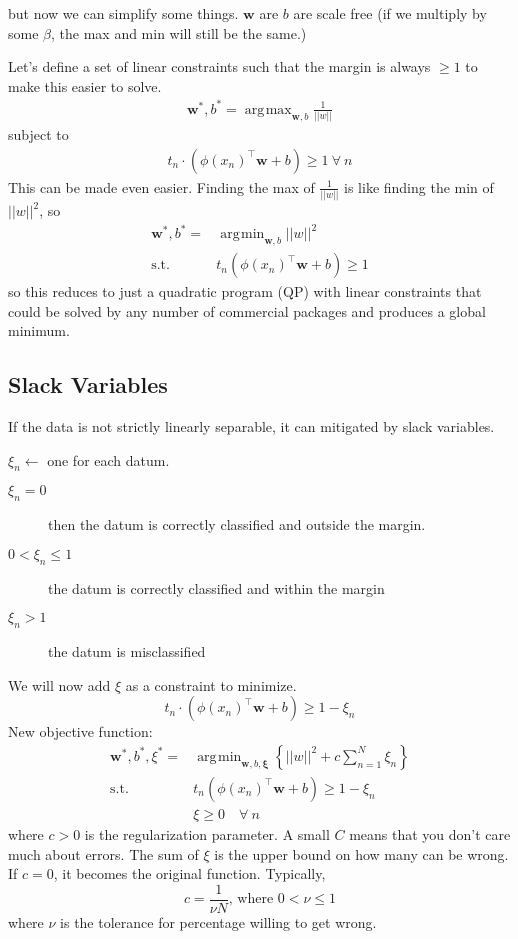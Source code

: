 \documentclass[11pt, oneside]{article}   	%
\DeclareMathOperator*{\argmin}{\arg\!\min}
\DeclareMathOperator*{\argmax}{\arg\!\max}
\begin{document}
but now we can simplify some things. $\mathbf{w}$ are $b$ are scale free (if we multiply by some $\beta$, the max and min will still be the same.)

Let's define a set of linear constraints such that the margin is always $\ge 1$ to make this easier to solve.
\begin{align}
\mathbf{w}^*,b^*= \argmax_{\mathbf{w},b}\frac{1}{||w||}
\end{align}
subject to 
\begin{align}
t_n\cdot(\phi(x_n)^\intercal\mathbf{w}+b) \ge 1 \:\forall\: n
\end{align}
This can be made even easier. Finding the max of $\frac{1}{||w||}$ is like finding the min of $||w||^2$, so
\begin{align}
\mathbf{w}^*,b^*=& \argmin_{\mathbf{w},b}||w||^2 \\
\text{s.t.} \:& t_n(\phi(x_n)^\intercal\mathbf{w} + b) \ge 1
\end{align}
so this reduces to just a quadratic program (QP) with linear constraints that could be solved by any number of commercial packages and produces a global minimum.

\subsection{Slack Variables}
If the data is not strictly linearly separable, it can mitigated by slack variables.

$\xi_n \leftarrow$ one for each datum. 
\begin{description}
 \item[$\xi_n = 0$] then the datum is correctly classified and outside the margin.
 \item[$0 < \xi_n \le 1$] the datum is correctly classified and within the margin
 \item[$\xi_n > 1$] the datum is misclassified
\end{description}

We will now add $\xi$ as a constraint to minimize.
\[
t_n\cdot(\phi(x_n)^\intercal\mathbf{w}+b) \ge 1 - \xi_n
\]
New objective function:
\begin{align}
\mathbf{w}^*,b^*,\xi^*=& \argmin_{\mathbf{w},b,\mathbf{\xi}}\left\{||w||^2+ c \sum_{n=1}^{N}\xi_n\right\}\\
\text{s.t.} \:& t_n(\phi(x_n)^\intercal\mathbf{w} + b) \ge 1 -\xi_n\\
& \xi \ge 0 \quad \forall \:n
\end{align}
where $c>0$ is the regularization parameter. A small $C$ means that you don't care much about errors. The sum of $\xi$ is the upper bound on how many can be wrong. If $c = 0$, it becomes the original function.
Typically,
\[
c=\frac{1}{\nu N} \text{, where } 0 < \nu \le 1
\]
where $\nu$ is the tolerance for percentage willing to get wrong.
\end{document}
